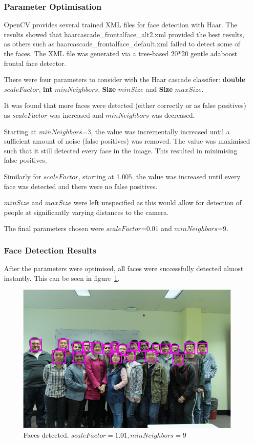 \documentclass{article}
\begin{document}
\subsubsection{Parameter Optimisation}
OpenCV provides several trained XML files for face detection with Haar. The results showed that haarcascade\_frontalface\_alt2.xml provided the best results, as others such as haarcascade\_frontalface\_default.xml failed to detect some of the faces. The XML file was generated via a tree-based 20*20 gentle adaboost frontal face detector.

There were four parameters to consider with the Haar cascade classifier: \textbf{double} $scaleFactor$, \textbf{int} $minNeighbors$, \textbf{Size} $minSize$ and \textbf{Size} $maxSize$.

It was found that more faces were detected (either correctly or as false positives) as $scaleFactor$ was increased and $minNeighbors$ was decreased.

Starting at $minNeighbors$=3, the value was incrementally increased until a sufficient amount of noise (false positives) was removed. The value was maximised such that it still detected every face in the image. This resulted in minimising false positives.

Similarly for $scaleFactor$, starting at 1.005, the value was increased until every face was detected and there were no false positives.

$minSize$ and $maxSize$ were left unspecified as this would allow for detection of people at significantly varying distances to the camera.

The final parameters chosen were $scaleFactor$=0.01 and $minNeighbors$=9.

\subsubsection{Face Detection Results}
After the parameters were optimised, all faces were successfully detected almost instantly. This can be seen in figure~\ref{fig:group}.
\begin{figure}[H]
\centering
\includegraphics[width=0.7\linewidth]{./groupdetected}
\caption{Faces detected. $scaleFactor=1.01, minNeighbors=9$}
\label{fig:group}
\end{figure}
\end{document}
